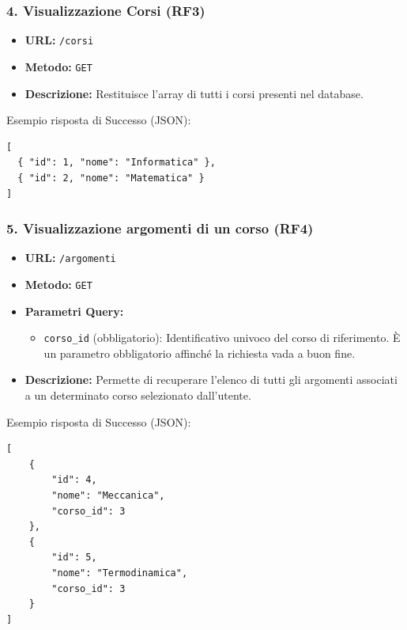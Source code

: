 \subsubsection{4. Visualizzazione Corsi (RF3)}
\begin{itemize}
    \item \textbf{URL:} \texttt{/corsi}
    \item \textbf{Metodo:} \texttt{GET}
    \item \textbf{Descrizione:} Restituisce l'array di tutti i corsi presenti nel database.
\end{itemize}
Esempio risposta di Successo (JSON):
\begin{verbatim}
[
  { "id": 1, "nome": "Informatica" },
  { "id": 2, "nome": "Matematica" }
]
\end{verbatim}

\subsubsection{5. Visualizzazione argomenti di un corso (RF4)}
\begin{itemize}
    \item \textbf{URL:} \texttt{/argomenti}
    \item \textbf{Metodo:} \texttt{GET}
    \item \textbf{Parametri Query:} 
        \begin{itemize}
            \item \texttt{corso\_id} (obbligatorio): Identificativo univoco del corso di riferimento. È un parametro obbligatorio affinché la richiesta vada a buon fine.
        \end{itemize}
    \item \textbf{Descrizione:} Permette di recuperare l'elenco di tutti gli argomenti associati a un determinato corso selezionato dall'utente.
\end{itemize}
Esempio risposta di Successo (JSON):
\begin{verbatim}
[
    {
        "id": 4,
        "nome": "Meccanica",
        "corso_id": 3
    },
    {
        "id": 5,
        "nome": "Termodinamica",
        "corso_id": 3
    }
]
\end{verbatim}


